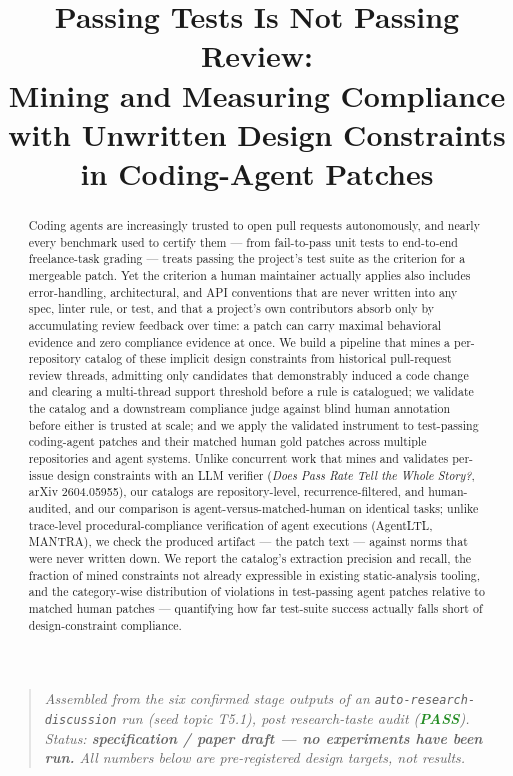 \documentclass[11pt]{article}
\title{\textbf{Passing Tests Is Not Passing Review:\\ Mining and Measuring Compliance with Unwritten Design Constraints in Coding-Agent Patches}}
\author{}
\date{}
\begin{document}
\maketitle
\vspace{-2em}

\begin{quote}
\small\textit{Assembled from the six confirmed stage outputs of an \texttt{auto-research-discussion} run (seed topic T5.1), post research-taste audit (\textcolor{ForestGreen}{\textbf{PASS}}). Status: \textbf{specification / paper draft --- no experiments have been run.} All numbers below are pre-registered design targets, not results.}
\end{quote}

\begin{abstract}
Coding agents are increasingly trusted to open pull requests autonomously, and nearly every benchmark used to certify them --- from fail-to-pass unit tests to end-to-end freelance-task grading --- treats passing the project's test suite as the criterion for a mergeable patch. Yet the criterion a human maintainer actually applies also includes error-handling, architectural, and API conventions that are never written into any spec, linter rule, or test, and that a project's own contributors absorb only by accumulating review feedback over time: a patch can carry maximal behavioral evidence and zero compliance evidence at once. We build a pipeline that mines a per-repository catalog of these implicit design constraints from historical pull-request review threads, admitting only candidates that demonstrably induced a code change and clearing a multi-thread support threshold before a rule is catalogued; we validate the catalog and a downstream compliance judge against blind human annotation before either is trusted at scale; and we apply the validated instrument to test-passing coding-agent patches and their matched human gold patches across multiple repositories and agent systems. Unlike concurrent work that mines and validates per-issue design constraints with an LLM verifier (\textit{Does Pass Rate Tell the Whole Story?}, arXiv 2604.05955), our catalogs are repository-level, recurrence-filtered, and human-audited, and our comparison is agent-versus-matched-human on identical tasks; unlike trace-level procedural-compliance verification of agent executions (AgentLTL, MANTRA), we check the produced artifact --- the patch text --- against norms that were never written down. We report the catalog's extraction precision and recall, the fraction of mined constraints not already expressible in existing static-analysis tooling, and the category-wise distribution of violations in test-passing agent patches relative to matched human patches --- quantifying how far test-suite success actually falls short of design-constraint compliance.
\end{abstract}
\end{document}
